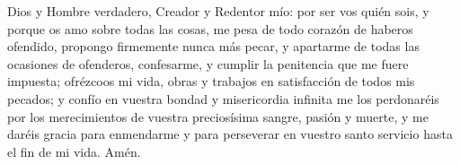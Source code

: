 Dios y Hombre verdadero, Creador y Redentor mío: por ser vos quién sois, y porque os amo sobre todas las cosas,
me pesa de todo corazón de haberos ofendido, propongo firmemente nunca más pecar, y apartarme de todas las ocasiones de ofenderos,
confesarme, y cumplir la penitencia que me fuere impuesta; ofrézcoos mi vida, obras y trabajos en satisfacción de todos mis pecados;
y confío en vuestra bondad y misericordia infinita me los perdonaréis por los merecimientos de vuestra preciosísima sangre, pasión y muerte,
y me daréis gracia para enmendarme y para perseverar en vuestro santo servicio hasta el fin de mi vida. Amén.